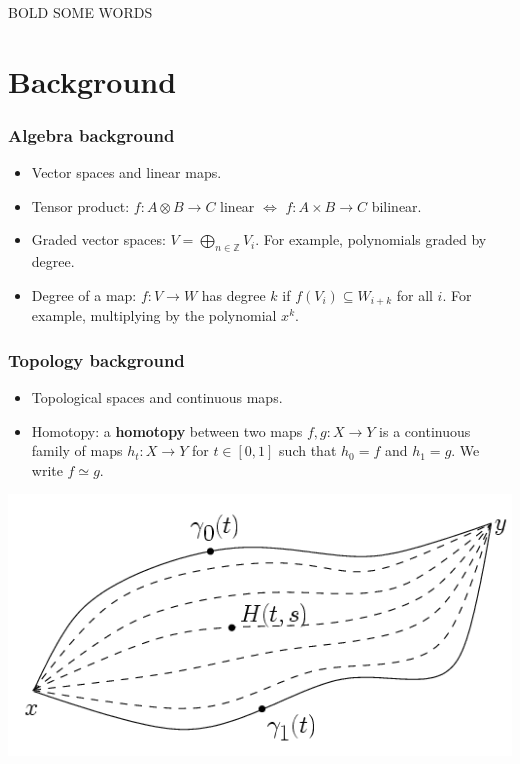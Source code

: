 \documentclass{beamer}
\theoremstyle{definition}
\newcommand{\Z}{\mathbb{Z}}
\begin{document}
\begin{frame}
BOLD SOME WORDS 





\end{frame}

\section{Background}

\begin{frame}
\frametitle{Algebra background}
\begin{itemize}
\item<1-> Vector spaces and linear maps.
\item<2-> Tensor product: $f:A\otimes B\to C$ linear $\Leftrightarrow$ $f:A\times B\to C$ bilinear. %
\item<3-> Graded vector spaces: $V=\bigoplus_{n\in\Z} V_i$. For example, polynomials graded by degree. %
\item<4-> Degree of a map: $f:V\to W$ has degree $k$ if $f(V_i)\subseteq W_{i+k}$ for all $i$. For example, multiplying by the polynomial $x^k$.
\end{itemize}
\end{frame}

\begin{frame}
\frametitle{Topology background}
\begin{itemize}
\item<1-> Topological spaces and continuous maps. %
\item<2-> Homotopy: a \textbf{homotopy} between two maps $f,g:X\to Y$ is a continuous family of maps $h_t:X\to Y$ for $t\in[0,1]$ such that $h_0=f$ and $h_1=g$. We write $f\simeq g$. %

\end{itemize}
\end{frame}
\begin{frame}
\includegraphics[scale=0.5]{Imagenes/Homotopy}
\end{frame}
\end{document}
